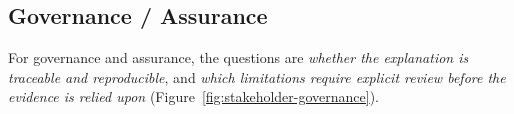 \subsection{Governance / Assurance}
For governance and assurance, the questions are \emph{whether the explanation is traceable and
reproducible}, and \emph{which limitations require explicit review before the evidence is
relied upon} (Figure~\ref{fig:stakeholder-governance}).\par\medskip
%


